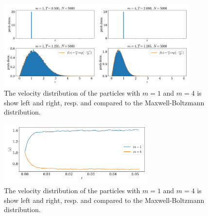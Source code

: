 \documentclass{article}
\begin{document}
    \begin{figure}[H]
        \centering
        \includegraphics[width=0.9\textwidth]{../plots/problem2/vel_dist.pdf}
        \caption{The velocity distribution of the particles with $m=1$ and $m=4$ is show left and right, resp. and compared to the Maxwell-Boltzmann distribution.}
        \label{problem2 dist}
    \end{figure}
    \begin{figure}[H]
        \centering
        \includegraphics[width=0.7\textwidth]{../plots/problem2/v_av.pdf}
        \caption{The velocity distribution of the particles with $m=1$ and $m=4$ is show left and right, resp. and compared to the Maxwell-Boltzmann distribution.}
        \label{problem2 av vel}
    \end{figure}
\end{document}
